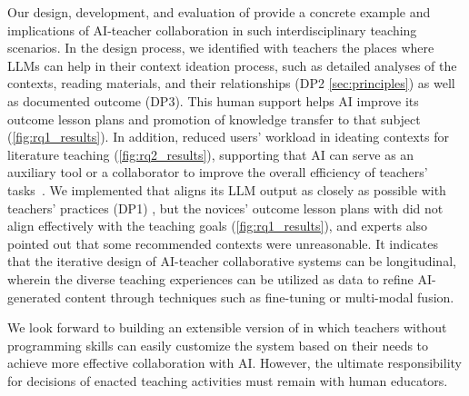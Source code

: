 {Our design, development, and evaluation of \name{} provide a concrete example and implications of AI-teacher collaboration in such interdisciplinary teaching scenarios. 
In the design process, we identified with teachers the places where LLMs can help in their context ideation process, such as detailed analyses of the contexts, reading materials, and their relationships (DP2 \autoref{sec:principles}) as well as documented outcome (DP3). 
This human support helps AI improve its outcome lesson plans and promotion of knowledge transfer to that subject (\autoref{fig:rq1_results}). 
In addition, \name{} reduced users' workload in ideating contexts for literature teaching (\autoref{fig:rq2_results}), supporting that AI can serve as an auxiliary tool or a collaborator to improve the overall efficiency of teachers' tasks~\cite{holter2024deconstructing}. 
We implemented \name{} that aligns its LLM output as closely as possible with teachers' practices (DP1)
, but the novices' outcome lesson plans with \name{} did not align effectively with the teaching goals (\autoref{fig:rq1_results}), and experts also pointed out that some recommended contexts were unreasonable. 
It indicates that the iterative design of AI-teacher collaborative systems can be longitudinal, wherein the diverse teaching experiences can be utilized as data to refine AI-generated content through techniques such as fine-tuning or multi-modal fusion. 

We look forward to building an extensible version of \name{} in which teachers without programming skills can easily customize the system based on their needs to achieve more effective collaboration with AI. 
However, the ultimate responsibility for decisions of enacted teaching activities must remain with human educators. 
}

